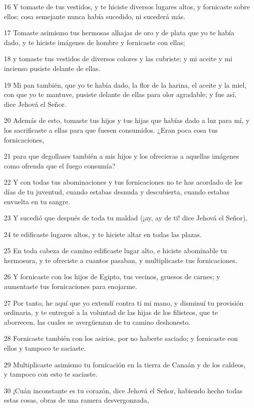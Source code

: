 \par 16 Y tomaste de tus vestidos, y te hiciste diversos lugares altos, y fornicaste sobre ellos; cosa semejante nunca había sucedido, ni sucederá más.
\par 17 Tomaste asimismo tus hermosas alhajas de oro y de plata que yo te había dado, y te hiciste imágenes de hombre y fornicaste con ellas;
\par 18 y tomaste tus vestidos de diversos colores y las cubriste; y mi aceite y mi incienso pusiste delante de ellas.
\par 19 Mi pan también, que yo te había dado, la flor de la harina, el aceite y la miel, con que yo te mantuve, pusiste delante de ellas para olor agradable; y fue así, dice Jehová el Señor.
\par 20 Además de esto, tomaste tus hijos y tus hijas que habías dado a luz para mí, y los sacrificaste a ellas para que fuesen consumidos. ¿Eran poca cosa tus fornicaciones,
\par 21 para que degollases también a mis hijos y los ofrecieras a aquellas imágenes como ofrenda que el fuego consumía?
\par 22 Y con todas tus abominaciones y tus fornicaciones no te has acordado de los días de tu juventud, cuando estabas desnuda y descubierta, cuando estabas envuelta en tu sangre.
\par 23 Y sucedió que después de toda tu maldad (¡ay, ay de ti! dice Jehová el Señor),
\par 24 te edificaste lugares altos, y te hiciste altar en todas las plazas.
\par 25 En toda cabeza de camino edificaste lugar alto, e hiciste abominable tu hermosura, y te ofreciste a cuantos pasaban, y multiplicaste tus fornicaciones.
\par 26 Y fornicaste con los hijos de Egipto, tus vecinos, gruesos de carnes; y aumentaste tus fornicaciones para enojarme.
\par 27 Por tanto, he aquí que yo extendí contra ti mi mano, y disminuí tu provisión ordinaria, y te entregué a la voluntad de las hijas de los filisteos, que te aborrecen, las cuales se avergüenzan de tu camino deshonesto.
\par 28 Fornicaste también con los asirios, por no haberte saciado; y fornicaste con ellos y tampoco te saciaste.
\par 29 Multiplicaste asimismo tu fornicación en la tierra de Canaán y de los caldeos, y tampoco con esto te saciaste.
\par 30 ¡Cuán inconstante es tu corazón, dice Jehová el Señor, habiendo hecho todas estas cosas, obras de una ramera desvergonzada,
